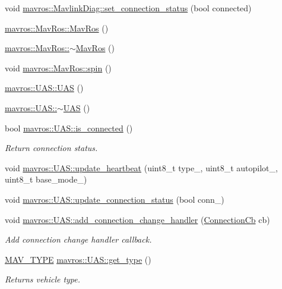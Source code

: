 \begin{DoxyCompactItemize}
\item 
void \mbox{\hyperlink{group__nodelib_ga53b91990e409eb66ad3dfcc6cefa0435}{mavros\+::\+Mavlink\+Diag\+::set\+\_\+connection\+\_\+status}} (bool connected)
\item 
\mbox{\hyperlink{group__nodelib_gaa8188d2a9ae2324e2a91f2ec12077715}{mavros\+::\+Mav\+Ros\+::\+Mav\+Ros}} ()
\item 
\mbox{\hyperlink{group__nodelib_ga34b0d289748daac51cfc675e50def27c}{mavros\+::\+Mav\+Ros\+::$\sim$\+Mav\+Ros}} ()
\item 
void \mbox{\hyperlink{group__nodelib_ga0ab105c6877addaf2149bac6371746e0}{mavros\+::\+Mav\+Ros\+::spin}} ()
\item 
\mbox{\hyperlink{group__nodelib_ga73bb173cfb9914f380671cb0f3efb113}{mavros\+::\+U\+A\+S\+::\+U\+AS}} ()
\item 
\mbox{\hyperlink{group__nodelib_gab273c619e0a6433f1ea3291103ec3710}{mavros\+::\+U\+A\+S\+::$\sim$\+U\+AS}} ()
\item 
bool \mbox{\hyperlink{group__nodelib_gae5ac050d003fe823d5c483e7f636e91c}{mavros\+::\+U\+A\+S\+::is\+\_\+connected}} ()
\begin{DoxyCompactList}\small\item\em Return connection status. \end{DoxyCompactList}\item 
void \mbox{\hyperlink{group__nodelib_gad353627789d9fa0e4cafb7fb8dad9b32}{mavros\+::\+U\+A\+S\+::update\+\_\+heartbeat}} (uint8\+\_\+t type\+\_\+, uint8\+\_\+t autopilot\+\_\+, uint8\+\_\+t base\+\_\+mode\+\_\+)
\item 
void \mbox{\hyperlink{group__nodelib_ga566ad54aab4ddea1c0e3756870fe9c91}{mavros\+::\+U\+A\+S\+::update\+\_\+connection\+\_\+status}} (bool conn\+\_\+)
\item 
void \mbox{\hyperlink{group__nodelib_gafb66aabf2079888fb4e1a07fcce2161c}{mavros\+::\+U\+A\+S\+::add\+\_\+connection\+\_\+change\+\_\+handler}} (\mbox{\hyperlink{group__nodelib_gae26d7ffaa66c0d7996857ca12600dab5}{Connection\+Cb}} cb)
\begin{DoxyCompactList}\small\item\em Add connection change handler callback. \end{DoxyCompactList}\item 
\mbox{\hyperlink{group__nodelib_ga96b408110c3646b92bef49d32ed1c84b}{M\+A\+V\+\_\+\+T\+Y\+PE}} \mbox{\hyperlink{group__nodelib_gaeac4cd692aff7e67498a1ad01ea95b9f}{mavros\+::\+U\+A\+S\+::get\+\_\+type}} ()
\begin{DoxyCompactList}\small\item\em Returns vehicle type. \end{DoxyCompactList}\item 

\end{DoxyCompactItemize}

